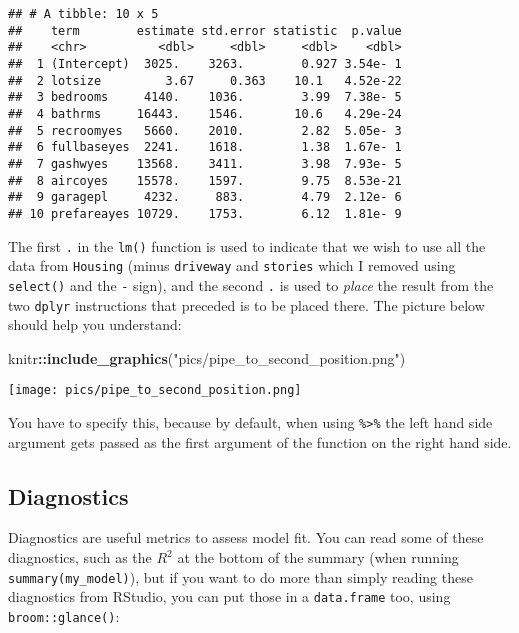 \documentclass[
]{article}
\newenvironment{Shaded}{\begin{snugshade}}{\end{snugshade}}
\newcommand{\KeywordTok}[1]{\textcolor[rgb]{0.13,0.29,0.53}{\textbf{#1}}}
\newcommand{\NormalTok}[1]{#1}
\newcommand{\OperatorTok}[1]{\textcolor[rgb]{0.81,0.36,0.00}{\textbf{#1}}}
\newcommand{\StringTok}[1]{\textcolor[rgb]{0.31,0.60,0.02}{#1}}
\begin{document}
\begin{verbatim}
## # A tibble: 10 x 5
##    term        estimate std.error statistic  p.value
##    <chr>          <dbl>     <dbl>     <dbl>    <dbl>
##  1 (Intercept)  3025.    3263.        0.927 3.54e- 1
##  2 lotsize         3.67     0.363    10.1   4.52e-22
##  3 bedrooms     4140.    1036.        3.99  7.38e- 5
##  4 bathrms     16443.    1546.       10.6   4.29e-24
##  5 recroomyes   5660.    2010.        2.82  5.05e- 3
##  6 fullbaseyes  2241.    1618.        1.38  1.67e- 1
##  7 gashwyes    13568.    3411.        3.98  7.93e- 5
##  8 aircoyes    15578.    1597.        9.75  8.53e-21
##  9 garagepl     4232.     883.        4.79  2.12e- 6
## 10 prefareayes 10729.    1753.        6.12  1.81e- 9
\end{verbatim}

The first \texttt{.} in the \texttt{lm()} function is used to indicate that we wish to use all the data from \texttt{Housing}
(minus \texttt{driveway} and \texttt{stories} which I removed using \texttt{select()} and the \texttt{-} sign), and the second \texttt{.} is
used to \emph{place} the result from the two \texttt{dplyr} instructions that preceded is to be placed there.
The picture below should help you understand:

\begin{Shaded}
\begin{Highlighting}[]
\NormalTok{knitr}\OperatorTok{::}\KeywordTok{include\_graphics}\NormalTok{(}\StringTok{"pics/pipe\_to\_second\_position.png"}\NormalTok{)}
\end{Highlighting}
\end{Shaded}

\texttt{[image: pics/pipe\_to\_second\_position.png]}

You have to specify this, because by default, when using \texttt{\%\textgreater{}\%} the left hand side argument gets
passed as the first argument of the function on the right hand side.

\hypertarget{diagnostics}{%
\subsection{Diagnostics}\label{diagnostics}}

Diagnostics are useful metrics to assess model fit. You can read some of these diagnostics, such as
the \(R^2\) at the bottom of the summary (when running \texttt{summary(my\_model)}), but if you want to do
more than simply reading these diagnostics from RStudio, you can put those in a \texttt{data.frame} too,
using \texttt{broom::glance()}:
\end{document}
